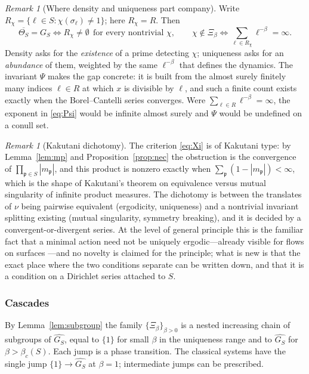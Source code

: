 \documentclass[11pt]{amsart}
\numberwithin{equation}{section}
\theoremstyle{definition}
\theoremstyle{remark}
\newtheorem{remark}[theorem]{Remark}
\newcommand{\pp}{\mathfrak{p}}
\begin{document}
\begin{remark}[Where density and uniqueness part company]\label{rem:parting}
Write $R_\chi=\{\ell\in S:\chi(\sigma_\ell)\neq1\}$; here $R_\chi=R$. Then
\[
\overline{\Theta_S}=G_S\iff R_\chi\neq\emptyset\ \ \text{for every nontrivial }\chi,
\qquad
\chi\notin\Xi_\beta\iff\sum_{\ell\in R_\chi}\ell^{-\beta}=\infty .
\]
Density asks for the \emph{existence} of a prime detecting $\chi$; uniqueness
asks for an \emph{abundance} of them, weighted by the same $\ell^{-\beta}$ that
defines the dynamics. The invariant $\Psi$ makes the gap concrete: it is built
from the almost surely finitely many indices $\ell\in R$ at which $x$ is
divisible by $\ell$, and such a finite count exists exactly when the
Borel--Cantelli series converges. Were $\sum_{\ell\in R}\ell^{-\beta}=\infty$,
the exponent in \eqref{eq:Psi} would be infinite almost surely and $\Psi$ would
be undefined on a conull set.
\end{remark}

\begin{remark}[Kakutani dichotomy]\label{rem:kakutani}
The criterion \eqref{eq:Xi} is of Kakutani type: by Lemma~\ref{lem:mp} and
Proposition~\ref{prop:nec} the obstruction is the convergence of
$\prod_{\pp\in S}|m_\pp|$, and this product is nonzero exactly when
$\sum_\pp(1-|m_\pp|)<\infty$, which is the shape of Kakutani's theorem on
equivalence versus mutual singularity of infinite product measures. The
dichotomy is between the translates of $\nu$ being pairwise equivalent
(ergodicity, uniqueness) and a nontrivial invariant splitting existing (mutual
singularity, symmetry breaking), and it is decided by a convergent-or-divergent
series. At the level of general principle this is the familiar fact that a
minimal action need not be uniquely ergodic---already visible for flows on
surfaces \cite{Fur}---and no novelty is claimed for the principle; what is new
is that the exact place where the two conditions separate can be written down,
and that it is a condition on a Dirichlet series attached to $S$.
\end{remark}

\subsubsection*{Cascades}

By Lemma~\ref{lem:subgroup} the family $\{\Xi_\beta\}_{\beta>0}$ is a nested
increasing chain of subgroups of $\widehat{G_S}$, equal to $\{1\}$ for small
$\beta$ in the uniqueness range and to $\widehat{G_S}$ for
$\beta>\beta_c(S)$. Each jump is a phase transition. The classical systems have
the single jump $\{1\}\to\widehat{G_S}$ at $\beta=1$; intermediate jumps can be
prescribed.
\end{document}
